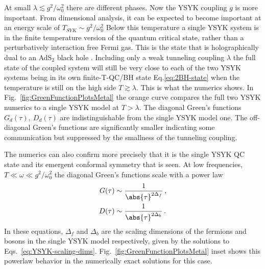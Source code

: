 At small $\lambda \lesssim g^{2}/\omega_0^2$ there are different phases. 
%
Now the YSYK coupling $g$ is more important.
From dimensional analysis, it can be expected to become important at an energy scale of $T_{SYK} \sim g^{2}/\omega_0^2$  Below this temperature a single YSYK system is in the finite temperature version of the quantum critical state, rather than a perturbatively interaction free Fermi gas. This is the state that is holographically dual to an AdS$_2$ black hole \cite{maldacenaCommentsSachdevYeKitaevModel2016}. Including only a weak tunneling coupling $\lambda$ the full state of the coupled system will still be very close to each of the two YSYK systems being in its own finite-T-QC/BH state Eq.\eqref{eq:2BH-state} when the temperature is still on the high side $T \gtrsim \lambda$. This is what the numerics shows. In Fig.~\ref{fig:GreenFunctionPlotsMetal} the orange curve compares the full two YSYK numerics to a single YSYK model at $T >\lambda $. The diagonal Green's functions $G_d(\tau),~ D_d(\tau)$ are indistinguishable from the single YSYK model one. The off-diagonal Green's functions are significantly smaller indicating some communication but suppressed by the smallness of the tunneling coupling. 


The numerics can also confirm more precisely that it is the single YSYK QC state and its emergent conformal symmetry that is seen. At low frequencies, $T\ll \omega \ll g^{2}/\omega_0^2$ the diagonal Green's functions scale with a power law 
\begin{align}
    G(\tau) & \sim \frac{1}{\abs{\tau}^{2\Delta_f}} \,,\\
    D(\tau) &\sim \frac{1}{\abs{\tau}^{2\Delta_b}} \,.
    \label{eq:scalingsolns}
\end{align}
In these equations, $\Delta_f$ and $\Delta_b$ are the scaling dimensions of the fermions and bosons in the single YSYK model respectively, given by the solutions to Eqs.~\eqref{eq:YSYK-scaling-dims}. 
Fig.~\ref{fig:GreenFunctionPlotsMetal} inset 
shows this powerlaw behavior in the numerically exact solutions for this case. 

